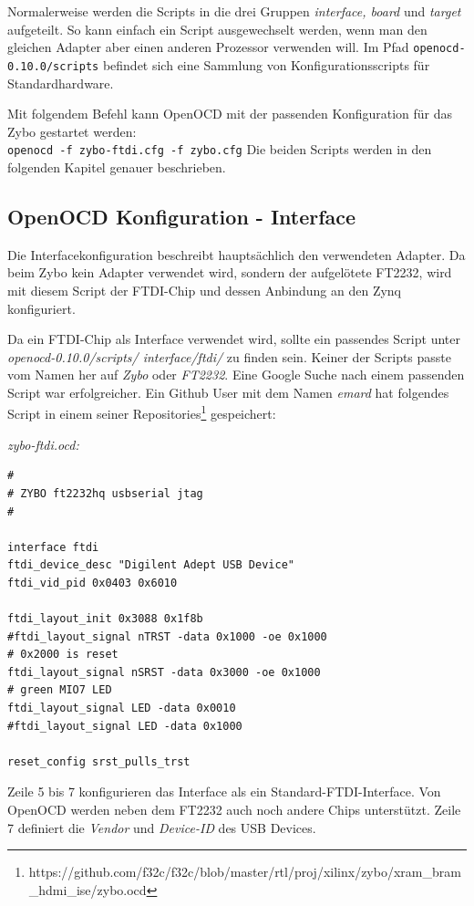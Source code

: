 Normalerweise werden die Scripts in die drei Gruppen \textit{interface, board} und \textit{target} aufgeteilt.
So kann einfach ein Script ausgewechselt werden, wenn man den gleichen Adapter aber einen anderen Prozessor verwenden will.
Im Pfad \texttt{openocd-0.10.0/scripts} befindet sich eine Sammlung von Konfigurationsscripts für Standardhardware.

Mit folgendem Befehl kann OpenOCD mit der passenden Konfiguration für das Zybo gestartet werden:\\
\texttt{openocd -f zybo-ftdi.cfg -f zybo.cfg}
Die beiden Scripts werden in den folgenden Kapitel genauer beschrieben.


\subsection{OpenOCD Konfiguration - Interface}
Die Interfacekonfiguration beschreibt hauptsächlich den verwendeten Adapter.
Da beim Zybo kein Adapter verwendet wird, sondern der aufgelötete FT2232, wird mit diesem Script der FTDI-Chip und dessen Anbindung an den Zynq konfiguriert.

Da ein FTDI-Chip als Interface verwendet wird, sollte ein passendes Script unter \textit{openocd-0.10.0/scripts/ interface/ftdi/} zu finden sein.
Keiner der Scripts passte vom Namen her auf \textit{Zybo} oder \textit{FT2232}.
Eine Google Suche nach einem passenden Script war erfolgreicher.
Ein Github User mit dem Namen \textit{emard} hat folgendes Script in einem seiner Repositories\footnote{https://github.com/f32c/f32c/blob/master/rtl/proj/xilinx/zybo/xram\_bram\_hdmi\_ise/zybo.ocd} gespeichert:

\textit{zybo-ftdi.ocd:}
\lstset{language=tcl}
\begin{lstlisting}[frame=single]
#
# ZYBO ft2232hq usbserial jtag
#

interface ftdi
ftdi_device_desc "Digilent Adept USB Device"
ftdi_vid_pid 0x0403 0x6010

ftdi_layout_init 0x3088 0x1f8b
#ftdi_layout_signal nTRST -data 0x1000 -oe 0x1000
# 0x2000 is reset
ftdi_layout_signal nSRST -data 0x3000 -oe 0x1000
# green MIO7 LED
ftdi_layout_signal LED -data 0x0010
#ftdi_layout_signal LED -data 0x1000

reset_config srst_pulls_trst

\end{lstlisting}

Zeile 5 bis 7 konfigurieren das Interface als ein Standard-FTDI-Interface.
Von OpenOCD werden neben dem FT2232 auch noch andere Chips unterstützt.
Zeile 7 definiert die \textit{Vendor} und \textit{Device-ID} des USB Devices.


